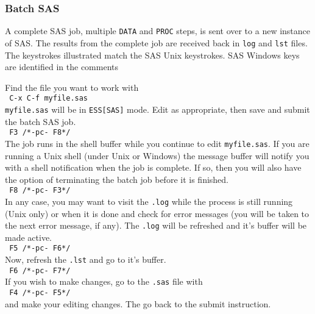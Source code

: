 \documentclass{article}
\newcommand{\stexttt}[1]{{\small\texttt{#1}}}
\newcommand{\elcode}[1]{\\{\stexttt{\hspace*{2em} #1}}\\}
\begin{document}

\subsubsection{Batch SAS}
\label{sec:SAS:batch}

A complete SAS job, multiple \stexttt{DATA} and \stexttt{PROC} steps,
is sent over to a new instance of SAS.  The results from the complete
job are received back in \stexttt{log} and \stexttt{lst} files.
The keystrokes illustrated match the SAS Unix keystrokes.
SAS Windows keys are identified in the comments

Find the file you want to work with
    \elcode{C-x C-f myfile.sas}
\stexttt{myfile.sas} will be in \stexttt{ESS[SAS]} mode.
Edit as appropriate, then save and submit the batch SAS job.
    \elcode{F3  /*-pc- F8*/}
The job runs in the shell buffer while you continue to edit 
\stexttt{myfile.sas}.  If you are running a Unix shell (under Unix or
Windows) the message buffer will notify you with a shell
notification when the job is complete.  If so, then you 
will also have the option of terminating the batch job
before it is finished.
    \elcode{F8  /*-pc- F3*/}
In any case, you may want to visit the \stexttt{.log} while the process
is still running (Unix only) or when it is done and check for
error messages 
(you will be taken to the next error message, if any).
The \stexttt{.log} will be refreshed and it's buffer will be made active.
    \elcode{F5  /*-pc- F6*/}
Now, refresh the \stexttt{.lst} and go to it's buffer.
    \elcode{F6  /*-pc- F7*/}
If you wish to make changes, go to the \stexttt{.sas} file with
    \elcode{F4 /*-pc- F5*/}
and make your editing changes.  The go back to the submit instruction.
\end{document}
